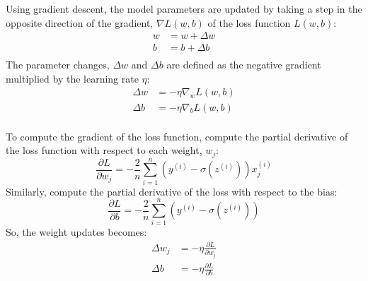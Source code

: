 \documentclass[../machine_learning_scikit.tex]{subfiles}
\begin{document}
    Using gradient descent, the model parameters are updated by taking a step in the opposite direction of the gradient, $\nabla L(w,b)$ of the loss function $L(w,b)$:
    \begin{equation*}
        \begin{split}
            w&=w+\Delta w\\
            b&=b+\Delta b\\
        \end{split}
    \end{equation*}
    The parameter changes, $\Delta w$ and $\Delta b$ are defined as the negative gradient multiplied by the learning rate $\eta$:
    \begin{equation*}
        \begin{split}
            \Delta w &= -\eta\nabla_{w}L(w,b) \\
            \Delta b &= -\eta\nabla_{b}L(w,b) \\
        \end{split}
    \end{equation*}

    To compute the gradient of the loss function, compute the partial derivative of the loss function with respect to each weight, $w_j$:
    \begin{equation*}
        \frac{\partial L}{\partial w_j}=-\frac{2}{n}\sum_{ i=1}^n\left(y^{(i)}-\sigma(z^{(i)})\right)x_j^{(i)}
    \end{equation*}
    Similarly, compute the partial derivative of the loss with respect to the bias:
    \begin{equation*}
        \frac{\partial L}{\partial b}=-\frac{2}{n}\sum_{ i=1}^n\left(y^{(i)}-\sigma(z^{(i)})\right)
    \end{equation*}
    So, the weight updates becomes:
    \begin{equation*}
        \begin{split}
            \Delta w_j &= -\eta\frac{\partial L}{\partial w_j} \\
            \Delta b &= -\eta\frac{\partial L}{\partial b}\\
        \end{split}
    \end{equation*}
\end{document}
